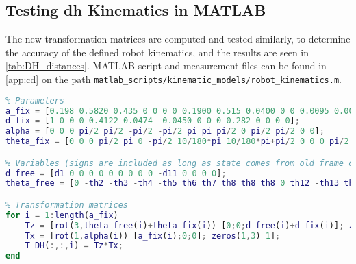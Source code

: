 \subsection{Testing \gls{dh} Kinematics in MATLAB}
The new transformation matrices are computed and tested similarly, to determine the accuracy of the defined robot kinematics, and the results are seen in \autoref{tab:DH_distances}.
MATLAB script and measurement files can be found in \autoref{app:cd} on the path \texttt{matlab\_scripts/kinematic\_models/robot\_kinematics.m}.
\begin{lstlisting}[language=matlab]
%% Coordinate frames defined according to Denavit-Hartenberg convention
% Parameters
a_fix = [0.198 0.5820 0.435 0 0 0 0 0.1900 0.515 0.0400 0 0 0.0095 0.0095 0.0095];
d_fix = [1 0 0 0 0.4122 0.0474 -0.0450 0 0 0 0.282 0 0 0 0];
alpha = [0 0 0 pi/2 pi/2 -pi/2 -pi/2 pi pi pi/2 0 pi/2 pi/2 0 0];
theta_fix = [0 0 0 pi/2 pi 0 -pi/2 10/180*pi 10/180*pi+pi/2 0 0 0 pi/2 0 0];

% Variables (signs are included as long as state comes from old frame convention)
d_free = [d1 0 0 0 0 0 0 0 0 0 -d11 0 0 0 0];
theta_free = [0 -th2 -th3 -th4 -th5 th6 th7 th8 th8 th8 0 th12 -th13 th14L -th14R];

% Transformation matrices
for i = 1:length(a_fix)
	Tz = [rot(3,theta_free(i)+theta_fix(i)) [0;0;d_free(i)+d_fix(i)]; zeros(1,3) 1];
	Tx = [rot(1,alpha(i)) [a_fix(i);0;0]; zeros(1,3) 1];
	T_DH(:,:,i) = Tz*Tx;
end
\end{lstlisting}

